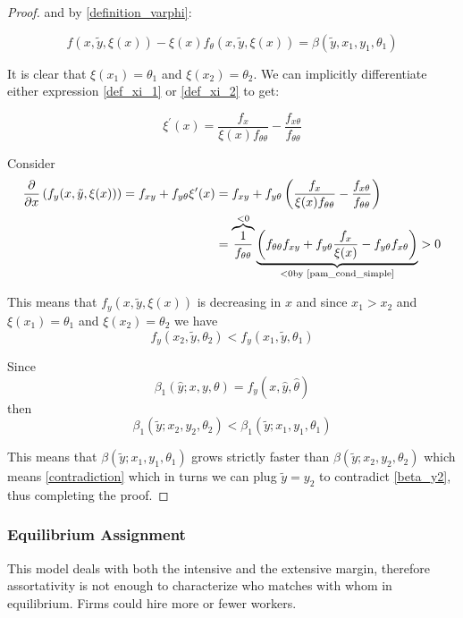 \documentclass[12pt]{article}
\theoremstyle{definition}
\begin{document}
\begin{proof}
and by \eqref{definition_varphi}:

\begin{equation}\label{def_xi_2}
f(x,\tilde{y},\xi(x)) - \xi(x)f_\theta(x,\tilde{y}, \xi(x)) = \beta(\tilde{y},x_1,y_1,\theta_1)\end{equation}

It is clear that $\xi(x_1) = \theta_1$ and $\xi(x_2) = \theta_2$. We can implicitly differentiate either expression \eqref{def_xi_1} or \eqref{def_xi_2} to get:

\begin{equation}
    \xi^{\prime}(x)=\frac{f_{x}}{\xi(x) f_{\theta \theta}}-\frac{f_{x \theta}}{f_{\theta \theta}}
\end{equation}

Consider 
\begin{align*}
\frac{\partial}{\partial x}\left(f_y(x, \tilde{y}, \xi(x))\right) = f_{xy} +f_{y\theta}\xi'(x) &= f_{xy} + f_{y\theta}\left(\frac{f_{x}}{\xi(x) f_{\theta \theta}}-\frac{f_{x \theta}}{f_{\theta \theta}}\right) \\ &=\overbrace{\frac{1}{f_{\theta \theta}}}^{<0}\underbrace{\left( f_{\theta \theta} f_{xy} +f_{y\theta}\frac{f_{x}}{\xi(x)}-f_{y \theta}f_{x \theta}\right)}_{<0 \text{by \eqref{pam_cond_simple}}}>0
\end{align*}

This means that $f_{y}(x,\tilde{y}, \xi(x))$ is decreasing in $x$ and since $x_1>x_2$ and $\xi(x_1) = \theta_1$ and $\xi(x_2) = \theta_2$ we have $$f_{y}(x_2,\tilde{y}, \theta_2) <f_{y}(x_1,\tilde{y}, \theta_1)$$

Since $$\beta_{1}(\hat{y} ; x, y, \theta)=f_{y}(x, \hat{y}, \hat{\theta})$$ 
 then $$
\beta_{1}\left(\tilde{y} ; x_{2}, y_{2}, \theta_{2}\right)<\beta_{1}\left(\tilde{y} ; x_{1}, y_{1}, \theta_{1}\right)
$$

This means that $\beta(\tilde{y}; x_1,y_1, \theta_1)$ grows strictly faster than $\beta(\tilde{y}; x_2,y_2, \theta_2)$ which means \eqref{contradiction} which in turns we can plug $\tilde{y} = y_2$ to contradict \eqref{beta_y2}, thus completing the proof. 

\end{proof}
\subsubsection{Equilibrium Assignment}
This model deals with both the intensive and the extensive margin, therefore assortativity is not enough to characterize who matches with whom in equilibrium. Firms could hire more or fewer workers. 
\end{document}
